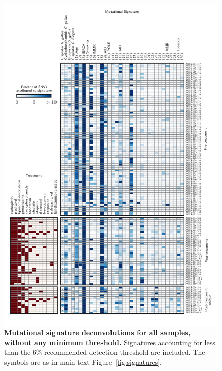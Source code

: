 \begin{figure}
\centering
\includegraphics[scale=1.0]{figures/supplementary_signatures_no_cutoff.pdf}
\caption{\textbf{Mutational signature deconvolutions for all samples, without any minimum threshold.} Signatures accounting for less than the 6\% recommended detection threshold are included. The symbols are as in main text Figure~\ref{fig:signatures}.}
\label{fig:supplementary_signatures_no_cutoff.pdf}
\end{figure}

